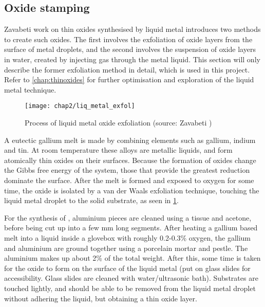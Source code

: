 \documentclass[../../Matt_Gebert_Honours_Thesis.tex]{subfiles}
\begin{document}
	\subsection{Oxide stamping}\label{sec:oxidestamp_chap2}
	Zavabeti \etals\cite{zavabeti_liquid_2017} work on thin oxides synthesised by liquid metal introduces two methods to create such oxides. The first involves the exfoliation of oxide layers from the surface of metal droplets, and the second involves the suspension of oxide layers in water, created by injecting gas through the metal liquid. This section will only describe the former exfoliation method in detail, which is used in this project. Refer to \cref{chap:thinoxides} for further optimisation and exploration of the liquid metal technique.
	
	\begin{figure}[H]
		\texttt{[image: chap2/liq\_metal\_exfol]}
		\caption[Liquid metal oxide exfoliation]{Process of liquid metal oxide exfoliation (source: Zavabeti \etal{}\cite{zavabeti_liquid_2017})}\label{fig:liq_metal_exfoliation}
	\end{figure}	
	
	A eutectic gallium melt is made by combining elements such as gallium, indium and tin. At room temperature these alloys are metallic liquids, and form atomically thin oxides on their surfaces. Because the formation of oxides change the Gibbs free energy of the system, those that provide the greatest reduction dominate the surface\cite{zavabeti_liquid_2017}. After the melt is formed and exposed to oxygen for some time, the oxide is isolated by a van der Waals exfoliation technique, touching the liquid metal droplet to the solid substrate, as seen in \cref{fig:liq_metal_exfoliation}.
	
	For the synthesis of \aluminimumoxide{}, aluminium pieces are cleaned using a tissue and acetone, before being cut up into a few mm long segments. After heating a gallium based melt into a liquid inside a glovebox with roughly 0.2-0.3\% oxygen, the gallium and aluminium are ground together using a porcelain mortar and pestle. The aluminium makes up about 2\% of the total weight. After this, some time is taken for the oxide to form on the surface of the liquid metal (put on glass slides for accessibility. Glass slides are cleaned with water/ultrasonic bath). Substrates are touched lightly, and should be able to be removed from the liquid metal droplet without adhering the liquid, but obtaining a thin oxide layer.
	
\end{document}
